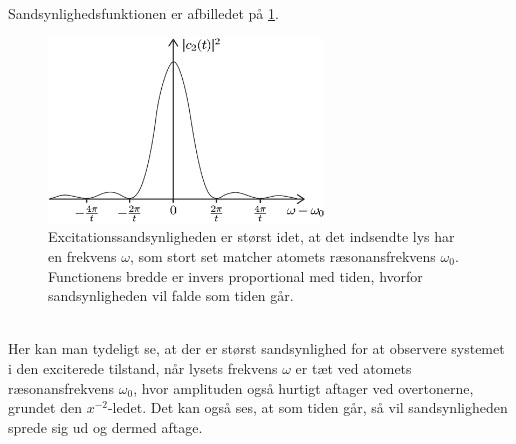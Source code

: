 Sandsynlighedsfunktionen er afbilledet på \cref{fig:Q03_ExcitationProbabilityFunction}.
\begin{figure}[!h]
    \centering
    \includegraphics[width=0.65\textwidth]{Q03/images/ExcitationProbabilityFunction.PNG}
    \caption{Excitationssandsynligheden er størst idet, at det indsendte lys har en frekvens $\omega$, som stort set matcher atomets ræsonansfrekvens $\omega_0$. Functionens bredde er invers proportional med tiden, hvorfor sandsynligheden vil falde som tiden går.}
    \label{fig:Q03_ExcitationProbabilityFunction}
\end{figure}\\
%
Her kan man tydeligt se, at der er størst sandsynlighed for at observere systemet i den exciterede tilstand, når lysets frekvens $\omega$ er tæt ved atomets ræsonansfrekvens $\omega_0$, hvor amplituden også hurtigt aftager ved overtonerne, grundet den $x^{-2}$-ledet. Det kan også ses, at som tiden går, så vil sandsynligheden sprede sig ud og dermed aftage.